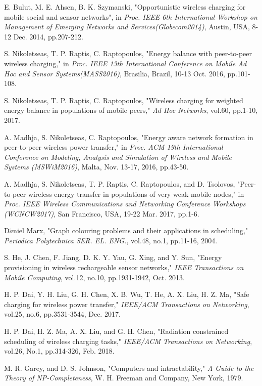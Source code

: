 \documentclass[12pt,journal,onecolumn,draftcls]{IEEEtran}
\begin{document}
\begin{thebibliography}{11}
E. Bulut, M. E. Ahsen, B. K. Szymanski, "Opportunistic wireless charging for mobile social and sensor networks", in \textit{Proc. IEEE 6th International Workshop on Management of Emerging Networks and Services(Globecom2014)}, Austin, USA, 8-12 Dec. 2014, pp.207-212.

S. Nikoletseas, T. P. Raptis, C. Raptopoulos, "Energy balance with peer-to-peer wireless charging," in \textit{Proc. IEEE 13th International Conference on Mobile Ad Hoc and Sensor Systems(MASS2016)}, Brasilia, Brazil, 10-13 Oct. 2016, pp.101-108.

S. Nikoletseas, T. P. Raptis, C. Raptopoulos, "Wireless charging for weighted energy balance in populations of mobile peers," \textit{Ad Hoc Networks}, vol.60, pp.1-10, 2017.

A. Madhja, S. Nikoletseas, C. Raptopoulos, "Energy aware network formation in peer-to-peer wireless power transfer," in \textit{Proc. ACM 19th International Conference on Modeling, Analysis and Simulation of Wireless and Mobile Systems (MSWiM2016)}, Malta, Nov. 13-17, 2016, pp.43-50.

A. Madhja, S. Nikoletseas, T. P. Raptis, C. Raptopoulos, and D. Tsolovos, "Peer-to-peer wireless energy transfer in populations of very weak mobile nodes," in \textit{Proc. IEEE Wireless Communications and Networking Conference Workshops (WCNCW2017)}, San Francisco, USA, 19-22 Mar. 2017, pp.1-6.

D$\acute{a}$niel Marx, "Graph colouring problems and their applications in scheduling," \textit{Periodica Polytechnica SER. EL. ENG.}, vol.48, no.1, pp.11-16, 2004.

S. He, J. Chen, F. Jiang, D. K. Y. Yau, G. Xing, and Y. Sun, "Energy provisioning in wireless rechargeable sensor networks," \textit{IEEE Transactions on Mobile Computing}, vol.12, no.10, pp.1931-1942, Oct. 2013.

H. P. Dai, Y. H. Liu, G. H. Chen, X. B. Wu, T. He, A. X. Liu, H. Z. Ma, "Safe charging for wireless power transfer," \textit{IEEE/ACM Transactions on Networking}, vol.25, no.6, pp.3531-3544, Dec. 2017.

H. P. Dai, H. Z. Ma, A. X. Liu, and G. H. Chen, "Radiation constrained scheduling of wireless charging tasks," \textit{IEEE/ACM Transactions on Networking}, vol.26, No.1, pp.314-326, Feb. 2018.

M. R. Garey, and D. S. Johnson, "Computers and intractability," \textit{A Guide to the Theory of NP-Completeness}, W. H. Freeman and Company, New York, 1979.


\end{thebibliography}
\end{document}
